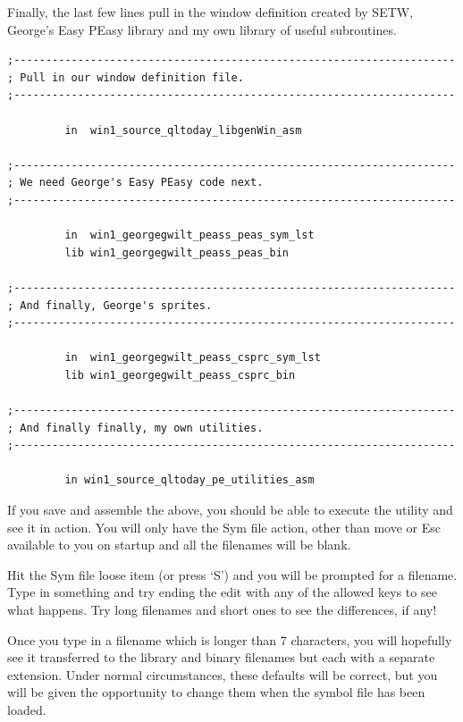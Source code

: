 Finally, the last few lines pull in the window definition created by
 SETW, George's Easy
    PEasy library and my own library of useful
    subroutines.

\begin{lstlisting}[firstnumber=last,caption={LibGen\_asm - Incorporating the Easy PEasy Library}]
;---------------------------------------------------------------------
; Pull in our window definition file.
;---------------------------------------------------------------------

         in  win1_source_qltoday_libgenWin_asm

;---------------------------------------------------------------------
; We need George's Easy PEasy code next.
;---------------------------------------------------------------------

         in  win1_georgegwilt_peass_peas_sym_lst
         lib win1_georgegwilt_peass_peas_bin

;---------------------------------------------------------------------
; And finally, George's sprites.
;---------------------------------------------------------------------

         in  win1_georgegwilt_peass_csprc_sym_lst
         lib win1_georgegwilt_peass_csprc_bin

;---------------------------------------------------------------------
; And finally finally, my own utilities.
;---------------------------------------------------------------------

         in win1_source_qltoday_pe_utilities_asm
\end{lstlisting}

If you save and assemble the above, you should be able to execute
    the utility and see it in action. You will only have the Sym file
    action, other than move or Esc available to you on startup and all the
    filenames will be blank.

Hit the Sym file loose item (or press `S') and you will be
    prompted for a filename. Type in something and try ending the edit with
    any of the allowed keys to see what happens. Try long filenames and short
    ones to see the differences, if any!

Once you type in a filename which is longer than 7 characters, you
    will hopefully see it transferred to the library and binary filenames but
    each with a separate extension. Under normal circumstances, these defaults
    will be correct, but you will be given the opportunity to change them when
    the symbol file has been loaded.

